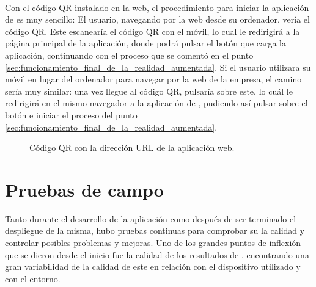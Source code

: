 \documentclass{subfiles}
\begin{document}
    \paragraph{}
    Con el código QR instalado en la web, el procedimiento para iniciar la aplicación de \ra es muy sencillo: El usuario, navegando por la web desde su ordenador, vería el código QR. Este escanearía el código QR con el móvil, lo cual le redirigirá a la página principal de la aplicación, donde podrá pulsar el botón que carga la aplicación, continuando con el proceso que se comentó en el punto \ref{sec:funcionamiento_final_de_la_realidad_aumentada}. Si el usuario utilizara su móvil en lugar del ordenador para navegar por la web de la empresa, el camino sería muy similar: una vez llegue al código QR, pulsaría sobre este, lo cuál le redirigirá en el mismo navegador a la aplicación de \ra, pudiendo así pulsar sobre el botón e iniciar el proceso del punto \ref{sec:funcionamiento_final_de_la_realidad_aumentada}.

    \begin{figure}[H]
    \centering
    \caption{Código QR con la dirección URL de la aplicación web.}
    \label{fig:5.1_qr_actualizado}
    \end{figure}

    \section{Pruebas de campo}
    \label{sec:pruebas_de_campo}
    Tanto durante el desarrollo de la aplicación como después de ser terminado el despliegue de la misma, hubo pruebas continuas para comprobar su la calidad y controlar posibles problemas y mejoras. Uno de los grandes puntos de inflexión que se dieron desde el inicio fue la calidad de los resultados de \hittest, encontrando una gran variabilidad de la calidad de este en relación con el dispositivo utilizado y con el entorno.
\end{document}

